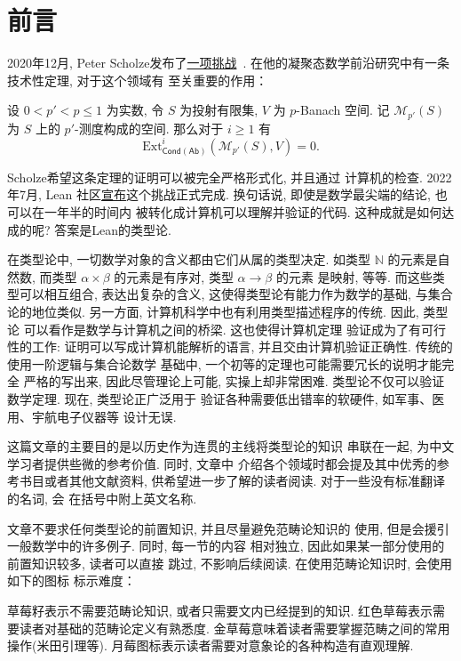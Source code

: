 \chapter{前言}
2020年12月, Peter Scholze发布了\href{https://xenaproject.wordpress.com/2020/12/05/liquid-tensor-experiment/}{一项挑战}~\cite{scholze:2020:liquid}.
在他的凝聚态数学前沿研究中有一条技术性定理, 对于这个领域有
至关重要的作用：
\begin{theorem}
设 \(0 < p' < p \le 1\) 为实数, 令 \(S\) 为投射有限集,
\(V\) 为 \(p\)-Banach 空间. 记 \(\mathcal M_{p'}(S)\)
为 \(S\) 上的 \(p'\)-测度构成的空间. 那么对于 \(i \ge 1\) 有
\[\mathrm{Ext}_{\mathsf{Cond}(\mathsf{Ab})}^i(
  \mathcal M_{p'}(S), V
) = 0.\]
\end{theorem}
Scholze希望这条定理的证明可以被完全严格形式化, 并且通过
计算机的检查. 2022年7月, Lean
社区\href{https://leanprover-community.github.io/blog/posts/lte-final/}{宣布}这个挑战正式完成.
换句话说, 即使是数学最尖端的结论, 也可以在一年半的时间内
被转化成计算机可以理解并验证的代码.
这种成就是如何达成的呢? 答案是Lean的类型论.

在类型论中, 一切数学对象的含义都由它们从属的类型决定.
如类型 \(\mathbb N\) 的元素是自然数, 而类型 \(\alpha \times \beta\)
的元素是有序对, 类型 \(\alpha \to\beta\) 的元素
是映射, 等等. 而这些类型可以相互组合, 表达出复杂的含义,
这使得类型论有能力作为数学的基础, 与集合论的地位类似.
另一方面, 计算机科学中也有利用类型描述程序的传统. 因此, 类型论
可以看作是数学与计算机之间的桥梁. 这也使得计算机定理
验证成为了有可行性的工作: 证明可以写成计算机能解析的语言,
并且交由计算机验证正确性. 传统的使用一阶逻辑与集合论数学
基础中, 一个初等的定理也可能需要冗长的说明才能完全
严格的写出来, 因此尽管理论上可能, 实操上却非常困难.
类型论不仅可以验证数学定理. 现在, 类型论正广泛用于
验证各种需要低出错率的软硬件, 如军事、医用、宇航电子仪器等
设计无误.

这篇文章的主要目的是以历史作为连贯的主线将类型论的知识
串联在一起, 为中文学习者提供些微的参考价值. 同时, 文章中
介绍各个领域时都会提及其中优秀的参考书目或者其他文献资料,
供希望进一步了解的读者阅读. 对于一些没有标准翻译的名词, 会
在括号中附上英文名称.

文章不要求任何类型论的前置知识, 并且尽量避免范畴论知识的
使用, 但是会援引一般数学中的许多例子. 同时, 每一节的内容
相对独立, 因此如果某一部分使用的前置知识较多, 读者可以直接
跳过, 不影响后续阅读. 在使用范畴论知识时, 会使用如下的图标
标示难度：
\begin{center}
\end{center}
草莓籽表示不需要范畴论知识, 或者只需要文内已经提到的知识.
红色草莓表示需要读者对基础的范畴论定义有熟悉度.
金草莓意味着读者需要掌握范畴之间的常用操作(米田引理等).
月莓图标表示读者需要对意象论的各种构造有直观理解.

